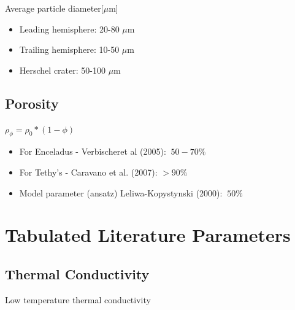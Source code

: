 \documentclass[11pt]{article} %
\begin{document}
	Average particle diameter[$\mu$m]
	\begin{itemize}
	\item Leading hemisphere: 20-80 $\mu$m
	\item Trailing hemisphere: 10-50 $\mu$m
	\item Herschel crater: 50-100 $\mu$m
	\end{itemize}

\subsection{Porosity}
\label{sec:porosity}

	$\rho_{\phi} = \rho_{0}*(1-\phi)$

	\begin{itemize}
	\item For Enceladus - Verbischeret al (2005): $~50-70\%$
	\item For Tethy's - Caravano et al. (2007): $>90\%$ 
	\item Model parameter (ansatz) Leliwa-Kopystynski (2000): $~50\%$
	\end{itemize}

\section{Tabulated Literature Parameters}
\label{sec:tabulated}
	
\subsection{Thermal Conductivity}
\label{sec:tconductivity}
	
	Low temperature thermal conductivity
	
\end{document}
